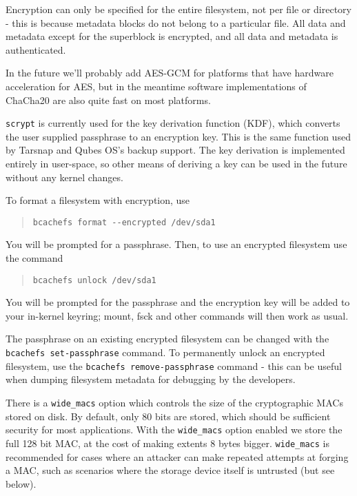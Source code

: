 \documentclass{article}
\begin{document}
Encryption can only be specified for the entire filesystem, not per file or
directory - this is because metadata blocks do not belong to a particular file.
All data and metadata except for the superblock is encrypted, and all data
and metadata is authenticated.

In the future we'll probably add AES-GCM for platforms that have hardware
acceleration for AES, but in the meantime software implementations of ChaCha20
are also quite fast on most platforms.

\texttt{scrypt} is currently used for the key derivation function (KDF), which
converts the user supplied passphrase to an encryption key.  This is the same
function used by Tarsnap and Qubes OS’s backup support.  The key derivation is
implemented entirely in user-space, so other means of deriving a key can be used
in the future without any kernel changes.


To format a filesystem with encryption, use
\begin{quote} \begin{verbatim}
bcachefs format --encrypted /dev/sda1
\end{verbatim} \end{quote}

You will be prompted for a passphrase. Then, to use an encrypted filesystem
use the command
\begin{quote} \begin{verbatim}
bcachefs unlock /dev/sda1
\end{verbatim} \end{quote}

You will be prompted for the passphrase and the encryption key will be added to
your in-kernel keyring; mount, fsck and other commands will then work as usual.

The passphrase on an existing encrypted filesystem can be changed with the
\texttt{bcachefs set-passphrase} command. To permanently unlock an encrypted
filesystem, use the \texttt{bcachefs remove-passphrase} command - this can be
useful when dumping filesystem metadata for debugging by the developers.

There is a \texttt{wide\_macs} option which controls the size of the
cryptographic MACs stored on disk. By default, only 80 bits are stored, which
should be sufficient security for most applications. With the
\texttt{wide\_macs} option enabled we store the full 128 bit MAC, at the cost of
making extents 8 bytes bigger.  \texttt{wide\_macs} is recommended for cases
where an attacker can make repeated attempts at forging a MAC, such as scenarios
where the storage device itself is untrusted (but see below).
\end{document}
